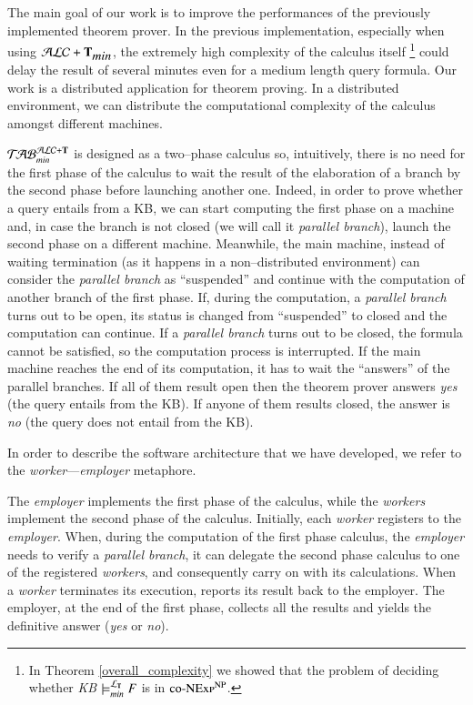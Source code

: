 \documentclass[a4paper, 11pt, oneside]{elsarticle}
\newcommand{\tip}{{\bf T}}
\newcommand{\alctmin}{\mathcal{ALC}+\tip_{\mbox{\em min}}}
\newcommand{\ellet} {\mathcal{L}_{\bf T}}
\newcommand{\nuovoc}{\mathrel{{\mathcal{T}\!\mathcal{AB}}}_{min}^{\mathcal{ALC}+\mbox{\scriptsize $\tip$}}}
\begin{document}
The main goal of our work is to improve the performances of the previously implemented theorem prover. In the previous implementation, especially when using $\alctmin$, the extremely high complexity of the calculus itself \footnote{In Theorem \ref{overall_complexity} we showed that the problem of deciding whether \emph{KB} $\models_{min}^{\ellet} F$ is in $\textsc{co-NExp}^\textsc{NP}$.} could delay the result of several minutes even for a medium length query formula.
Our work is a distributed application for theorem proving. In a distributed environment, we can distribute the computational complexity of the calculus amongst different machines.

$\nuovoc$ is designed as a two--phase calculus so, intuitively, there is no need for the first phase of the calculus to wait the result of the elaboration of a branch by the second phase before launching another one.
Indeed, in order to prove whether a query entails from a KB, we can start computing the first phase on a machine and, in case the branch is not closed (we will call it \emph{parallel branch}), launch the second phase on a different machine.
Meanwhile, the main machine, instead of waiting termination (as it happens in a non--distributed environment) can consider the \emph{parallel branch} as ``suspended'' and continue with the computation of another branch of the first phase.
If, during the computation, a \emph{parallel branch} turns out to be open, its status is changed from ``suspended'' to closed and the computation can continue.
If a \emph{parallel branch} turns out to be closed, the formula cannot be satisfied, so the computation process is interrupted.
If the main machine reaches the end of its computation, it has to wait the ``answers'' of the parallel branches.
If all of them result open then the theorem prover answers \emph{yes} (the query entails from the KB).
If anyone of them results closed, the answer is \emph{no} (the query does not entail from the KB).


In order to describe the software architecture that we have developed, we refer to the \emph{worker}---\emph{employer} metaphore.

The \emph{employer} implements the first phase of the calculus, while the \emph{workers} implement the second phase of the calculus.
Initially, each \emph{worker} registers to the \emph{employer}.
When, during the computation of the first phase calculus, the \emph{employer} needs to verify a \emph{parallel branch}, it can delegate the second phase calculus to one of the registered \emph{workers}, and consequently carry on with its calculations.
When a \emph{worker} terminates its execution, reports its result back to the employer.
The employer, at the end of the first phase, collects all the results and yields the definitive answer (\emph{yes} or \emph{no}).
\end{document}
